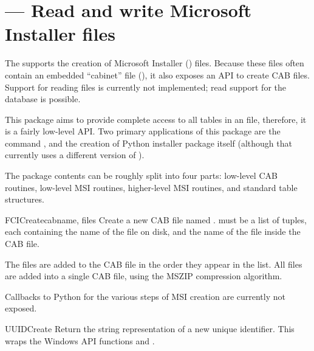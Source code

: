 \section{ ---
         Read and write Microsoft Installer files}




The  supports the creation of Microsoft Installer
() files.  Because these files often contain an embedded
``cabinet'' file (), it also exposes an API to create
CAB files. Support for reading  files is currently not
implemented; read support for the  database is possible.

This package aims to provide complete access to all tables in an
 file, therefore, it is a fairly low-level API. Two
primary applications of this package are the 
command , and the creation of Python installer
package itself (although that currently uses a different version
of ).

The package contents can be roughly split into four parts:
low-level CAB routines, low-level MSI routines, higher-level
MSI routines, and standard table structures.

\begin{funcdesc}{FCICreate}{cabname, files}
  Create a new CAB file named .  must
  be a list of tuples, each containing the name of the file on
  disk, and the name of the file inside the CAB file.

  The files are added to the CAB file in the order they appear
  in the list. All files are added into a single CAB file,
  using the MSZIP compression algorithm.

  Callbacks to Python for the various steps of MSI creation
  are currently not exposed.
\end{funcdesc}

\begin{funcdesc}{UUIDCreate}{}
  Return the string representation of a new unique identifier.
  This wraps the Windows API functions  and
  .
\end{funcdesc}

